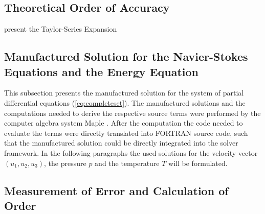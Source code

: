 \subsection{Theoretical Order of Accuracy}
      present the Taylor-Series Expansion

\subsection{Manufactured Solution for the Navier-Stokes Equations and the Energy Equation}
\label{sec:manufacturedsolution}

This subsection presents the manufactured solution for the system of partial differential equations (\ref{eq:completeset}). The manufactured solutions and the computations needed to derive the respective source terms were performed by the computer algebra system Maple \cite{maple}. After the computation the code needed to evaluate the terms were directly translated into FORTRAN source code, such that the manufactured solution could be directly integrated into the solver framework. In the following paragraphs the used solutions for the velocity vector \((u_1,u_2,u_3)\), the pressure \(p\) and the temperature \(T\) will be formulated.

\subsection{Measurement of Error and Calculation of Order}

